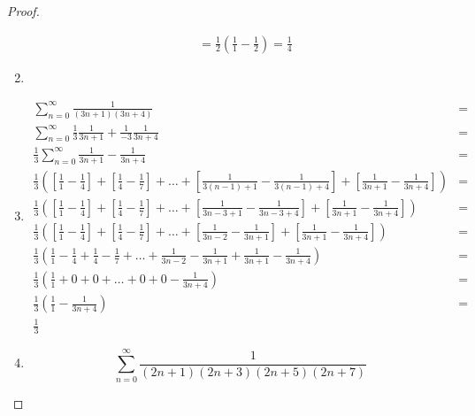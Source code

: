 \documentclass{../problemset}
\begin{document}
\begin{problem}
\begin{proof}
\begin{enumerate}
\begin{align}
			                                                     & = \frac{1}{2}\left(\frac{1}{1} - \frac{1}{2}\right) = \frac{1}{4}
		      \end{align}
		\item
		\item \begin{align*}
			      \sum_{n=0}^{\infty} \frac{1}{(3n + 1)(3n + 4)}                                                                                                                                                                                 & = \\
			      \sum_{n=0}^{\infty} \frac{1}{3}\frac{1}{3n + 1} + \frac{1}{-3}\frac{1}{3n + 4}                                                                                                                                                 & = \\
			      \frac{1}{3} \sum_{n=0}^{\infty} \frac{1}{3n + 1} - \frac{1}{3n + 4}                                                                                                                                                            & = \\
			      \frac{1}{3} \left(\left[\frac{1}{1} - \frac{1}{4}\right] + \left[\frac{1}{4} - \frac{1}{7}\right] + \ldots + \left[\frac{1}{3(n-1) + 1} - \frac{1}{3(n-1) +4}\right] + \left[\frac{1}{3n + 1} - \frac{1}{3n +4}\right] \right) & = \\
			      \frac{1}{3} \left(\left[\frac{1}{1} - \frac{1}{4}\right] + \left[\frac{1}{4} - \frac{1}{7}\right] + \ldots + \left[\frac{1}{3n -3 + 1} - \frac{1}{3n -3 + 4}\right] + \left[\frac{1}{3n + 1} - \frac{1}{3n +4}\right] \right)  & = \\
			      \frac{1}{3} \left(\left[\frac{1}{1} - \frac{1}{4}\right] + \left[\frac{1}{4} - \frac{1}{7}\right] + \ldots + \left[\frac{1}{3n - 2} - \frac{1}{3n + 1}\right] + \left[\frac{1}{3n + 1} - \frac{1}{3n +4}\right] \right)        & = \\
			      \frac{1}{3} \left(\frac{1}{1} - \frac{1}{4} + \frac{1}{4} - \frac{1}{7} + \ldots + \frac{1}{3n - 2} - \frac{1}{3n + 1} + \frac{1}{3n + 1} - \frac{1}{3n +4} \right)                                                            & = \\
			      \frac{1}{3} \left(\frac{1}{1} + 0 + 0 + \ldots + 0 + 0 - \frac{1}{3n +4} \right)                                                                                                                                               & = \\
			      \frac{1}{3} \left(\frac{1}{1} - \frac{1}{3n +4} \right)                                                                                                                                                                        & = \\
			      \frac{1}{3}
		      \end{align*}
		\item \[
			      \sum_{n=0}^{\infty} \frac{1}{(2n+1)(2n+3)(2n+5)(2n+7)}
		      \]
	\end{enumerate}
\end{proof}
\end{problem}
\end{document}
